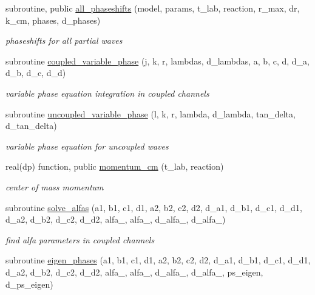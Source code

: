 \begin{DoxyCompactItemize}
\item 
subroutine, public \hyperlink{namespacenn__phaseshifts_aaeeb14cbe1324015fe5d7bff37607bb0}{all\+\_\+phaseshifts} (model, params, t\+\_\+lab, reaction, r\+\_\+max, dr, k\+\_\+cm, phases, d\+\_\+phases)
\begin{DoxyCompactList}\small\item\em phaseshifts for all partial waves \end{DoxyCompactList}\item 
subroutine \hyperlink{namespacenn__phaseshifts_a64b8d559b174ac865dfde5b7d067b5aa}{coupled\+\_\+variable\+\_\+phase} (j, k, r, lambdas, d\+\_\+lambdas, a, b, c, d, d\+\_\+a, d\+\_\+b, d\+\_\+c, d\+\_\+d)
\begin{DoxyCompactList}\small\item\em variable phase equation integration in coupled channels \end{DoxyCompactList}\item 
subroutine \hyperlink{namespacenn__phaseshifts_a3af2de3d09433aeda72d9bf4f252ac9e}{uncoupled\+\_\+variable\+\_\+phase} (l, k, r, lambda, d\+\_\+lambda, tan\+\_\+delta, d\+\_\+tan\+\_\+delta)
\begin{DoxyCompactList}\small\item\em variable phase equation for uncoupled waves \end{DoxyCompactList}\item 
real(dp) function, public \hyperlink{namespacenn__phaseshifts_a1d2c18032125ef6b75cc0170eb7c7cca}{momentum\+\_\+cm} (t\+\_\+lab, reaction)
\begin{DoxyCompactList}\small\item\em center of mass momentum \end{DoxyCompactList}\item 
subroutine \hyperlink{namespacenn__phaseshifts_afbf7c7b1957246b291a52e9b125ef04e}{solve\+\_\+alfas} (a1, b1, c1, d1, a2, b2, c2, d2, d\+\_\+a1, d\+\_\+b1, d\+\_\+c1, d\+\_\+d1, d\+\_\+a2, d\+\_\+b2, d\+\_\+c2, d\+\_\+d2, alfa\+\_, alfa\+\_, d\+\_\+alfa\+\_, d\+\_\+alfa\+\_)
\begin{DoxyCompactList}\small\item\em find alfa parameters in coupled channels \end{DoxyCompactList}\item 
subroutine \hyperlink{namespacenn__phaseshifts_aaf6bc866ac6041ef0c637dab1102128d}{eigen\+\_\+phases} (a1, b1, c1, d1, a2, b2, c2, d2, d\+\_\+a1, d\+\_\+b1, d\+\_\+c1, d\+\_\+d1, d\+\_\+a2, d\+\_\+b2, d\+\_\+c2, d\+\_\+d2, alfa\+\_, alfa\+\_, d\+\_\+alfa\+\_, d\+\_\+alfa\+\_, ps\+\_\+eigen, d\+\_\+ps\+\_\+eigen)

\end{DoxyCompactItemize}
